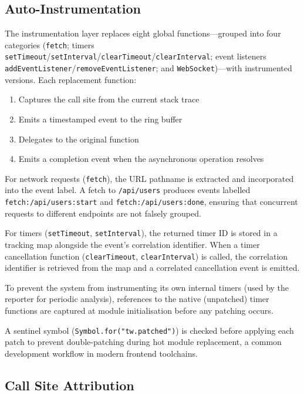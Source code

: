 \documentclass[11pt,a4paper]{article}
\begin{document}
\subsection{Auto-Instrumentation}

The instrumentation layer replaces eight global functions---grouped into four categories (\texttt{fetch}; timers \texttt{setTimeout}/\texttt{setInterval}/\texttt{clearTimeout}/\texttt{clearInterval}; event listeners \texttt{addEventListener}/\texttt{removeEventListener}; and \texttt{WebSocket})---with instrumented versions. Each replacement function:

\begin{enumerate}
  \item Captures the call site from the current stack trace
  \item Emits a timestamped event to the ring buffer
  \item Delegates to the original function
  \item Emits a completion event when the asynchronous operation resolves
\end{enumerate}

For network requests (\texttt{fetch}), the URL pathname is extracted and incorporated into the event label. A fetch to \texttt{/api/users} produces events labelled \texttt{fetch:/api/users:start} and \texttt{fetch:/api/users:done}, ensuring that concurrent requests to different endpoints are not falsely grouped.

For timers (\texttt{setTimeout}, \texttt{setInterval}), the returned timer ID is stored in a tracking map alongside the event's correlation identifier. When a timer cancellation function (\texttt{clearTimeout}, \texttt{clearInterval}) is called, the correlation identifier is retrieved from the map and a correlated cancellation event is emitted.

To prevent the system from instrumenting its own internal timers (used by the reporter for periodic analysis), references to the native (unpatched) timer functions are captured at module initialisation before any patching occurs.

A sentinel symbol (\texttt{Symbol.for("tw.patched")}) is checked before applying each patch to prevent double-patching during hot module replacement, a common development workflow in modern frontend toolchains.

\subsection{Call Site Attribution}
\end{document}
